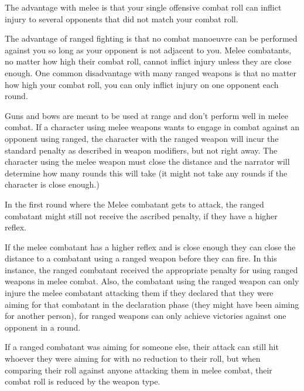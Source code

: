The advantage with melee is that your single offensive combat roll can inflict injury to several opponents that did not match your combat roll.

The advantage of ranged fighting is that no combat manoeuvre can be performed against you so long as your opponent is not adjacent to you. Melee combatants, no matter how high their combat roll, cannot inflict injury unless they are close enough. One common disadvantage with many ranged weapons is that no matter how high your combat roll, you can only inflict injury on one opponent each round.

Guns and bows are meant to be used at range and don’t perform well in melee combat. If a character using melee weapons wants to engage in combat against an opponent using ranged, the character with the ranged weapon will incur the standard penalty as described in weapon modifiers, but not right away. The character using the melee weapon must close the distance and the narrator will determine how many rounds this will take (it might not take any rounds if the character is close enough.)

In the first round where the Melee combatant gets to attack, the ranged combatant might still not receive the ascribed penalty, if they have a higher reflex.

If the melee combatant has a higher reflex and is close enough they can close the distance to a combatant using a ranged weapon before they can fire. In this instance, the ranged combatant received the appropriate penalty for using ranged weapons in melee combat. Also, the combatant using the ranged weapon can only injure the melee combatant attacking them if they declared that they were aiming for that combatant in the declaration phase (they might have been aiming for another person), for ranged weapons can only achieve victories against one opponent in a round.

If a ranged combatant was aiming for someone else, their attack can still hit whoever they were aiming for with no reduction to their roll, but when comparing their roll against anyone attacking them in melee combat, their combat roll is reduced by the weapon type.